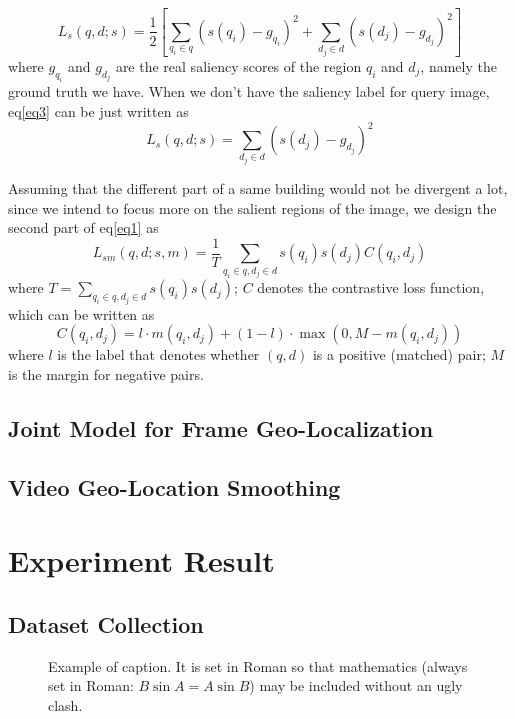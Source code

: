 \documentclass[10pt,twocolumn,letterpaper]{article}
\begin{document}
\begin{equation}\label{eq3}
L_s(q,d; s) = \frac12 [\sum_{q_i\in q}(s(q_i)-g_{q_i})^2 + \sum_{d_j\in d}(s(d_j)-g_{d_j})^2]
\end{equation}
where $g_{q_i}$ and $g_{d_j}$ are the real saliency scores of the region $q_i$ and $d_j$, namely the ground truth we have. When we don't have the saliency label for query image, eq\eqref{eq3} can be just written as
\begin{equation}\label{eq4}
L_s(q,d; s) =  \sum_{d_j\in d}(s(d_j)-g_{d_j})^2
\end{equation}
\par
Assuming that the different part of a same building would not be divergent a lot, since we intend to focus more on the salient regions of the image, we design the second part of eq\eqref{eq1} as
\begin{equation}
L_{sm}(q,d; s,m) = \frac1T  \sum_{q_i\in q, d_j\in d}  s(q_i)s(d_j) C(q_i,d_j)
\end{equation}
where $T = \sum_{q_i \in q, d_j \in d} s(q_i)s(d_j)$; $C$ denotes the contrastive loss function, which can be written as 
\begin{equation} \label{contrastive}
C(q_i, d_j) = l\cdot m(q_i, d_j) + (1-l)\cdot \max(0, M - m(q_i,d_j)) 
\end{equation}
where $l$ is the label that denotes whether $(q,d)$ is a positive (matched) pair; $M$ is the margin for negative pairs.
\subsection{Joint Model for Frame Geo-Localization}
\subsection{Video Geo-Location Smoothing}
\section{Experiment Result}
\subsection{Dataset Collection}

\begin{figure}[t]
\begin{center}
\fbox{\rule{0pt}{2in} \rule{0.9\linewidth}{0pt}}
\end{center}
   \caption{Example of caption.  It is set in Roman so that mathematics
   (always set in Roman: $B \sin A = A \sin B$) may be included without an
   ugly clash.}
\label{fig:long}
\label{fig:onecol}
\end{figure}
\end{document}
